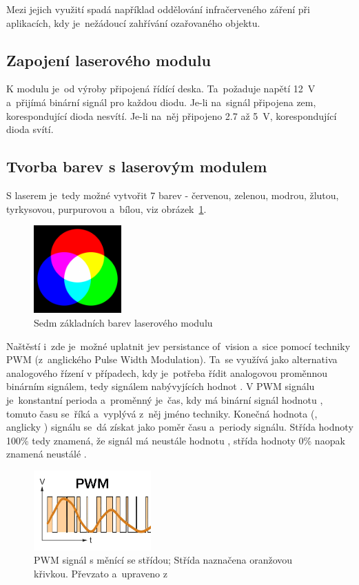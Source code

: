 Mezi jejich využití spadá například oddělování infračerveného záření při aplikacích, kdy je~nežádoucí zahřívání ozařovaného objektu.

\subsection{Zapojení laserového modulu}
K modulu je~od výroby připojená řídící deska. Ta~požaduje napětí 12~V a~přijímá binární signál pro každou diodu. Je-li na~signál připojena zem, korespondující dioda nesvítí. Je-li na~něj připojeno 2.7 až 5~V, korespondující dioda svítí.

\subsection{Tvorba barev s laserovým modulem}
S laserem je~tedy možné vytvořit 7 barev - červenou, zelenou, modrou, žlutou, tyrkysovou, purpurovou a~bílou, viz obrázek~\ref{fig:7colors}.

\begin{figure}[htb]
  \centering
  \includegraphics[width=0.3\textwidth]{img/7colors.png}
  \caption{\label{fig:7colors} Sedm základních barev laserového modulu}
\end{figure}

Naštěstí i~zde je~možné uplatnit jev persistance of~vision a~sice pomocí techniky PWM (z~anglického Pulse Width Modulation). Ta~se využívá jako alternativa analogového řízení v případech, kdy je~potřeba řídit analogovou proměnnou binárním signálem, tedy signálem nabývyjících hodnot .
V PWM signálu je~konstantní perioda a~proměnný je~čas, kdy má binární signál hodnotu , tomuto času se~říká  a~vyplývá z~něj jméno techniky. Konečná hodnota (, anglicky ) signálu se~dá získat jako poměr času  a~periody signálu. Střída hodnoty 100\% tedy znamená, že signál má neustále hodnotu , střída hodnoty 0\% naopak znamená neustálé .~\cite{pwm}\cite{wiki_pwm}

\begin{figure}[htb]
  \centering
  \includegraphics[width=0.4\textwidth]{img/pwm.jpg}
  \caption{\label{fig:pwm} PWM signál s měnící se střídou; Střída naznačena oranžovou křivkou. Převzato a~upraveno z~\cite{pwm-image}}
\end{figure}

